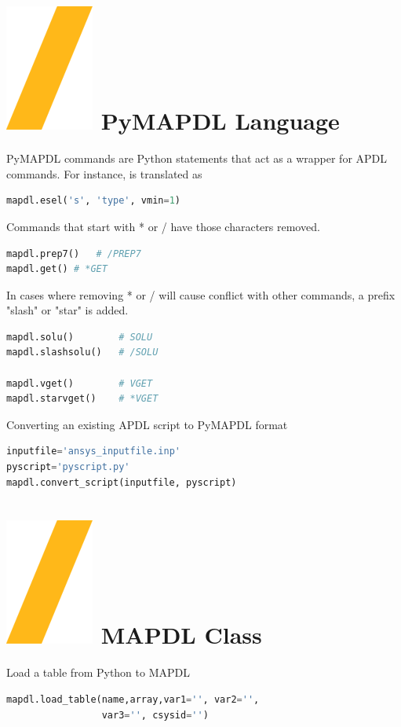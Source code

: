 \documentclass[9pt,landscape]{article}
\begin{document}
\begin{multicols}{3}
\section{\includegraphics[height=\fontcharht\font`\S]{slash.png} PyMAPDL Language}
PyMAPDL commands are Python statements that act as a wrapper for APDL commands. For instance,  is translated as
\begin{lstlisting}[language=Python]
mapdl.esel('s', 'type', vmin=1) 
\end{lstlisting}

Commands that start with * or / have those characters removed.
\begin{lstlisting}[language=Python]
mapdl.prep7()	# /PREP7
mapdl.get()	# *GET
\end{lstlisting}

In cases where removing * or / will cause conflict with other commands, a prefix "slash" or "star" is added.
\begin{lstlisting}[language=Python]
mapdl.solu()		# SOLU
mapdl.slashsolu()	# /SOLU

mapdl.vget()		# VGET
mapdl.starvget()	# *VGET
\end{lstlisting} 

\columnbreak
Converting an existing APDL script to PyMAPDL format
\begin{lstlisting}[language=Python]
inputfile='ansys_inputfile.inp'
pyscript='pyscript.py'
mapdl.convert_script(inputfile, pyscript)
\end{lstlisting} 

\section{\includegraphics[height=\fontcharht\font`\S]{slash.png} MAPDL Class}
Load a table from Python to MAPDL
\begin{lstlisting}[language=Python]
mapdl.load_table(name,array,var1='', var2='',
                 var3='', csysid='')
\end{lstlisting} 


\end{multicols}
\end{document}
